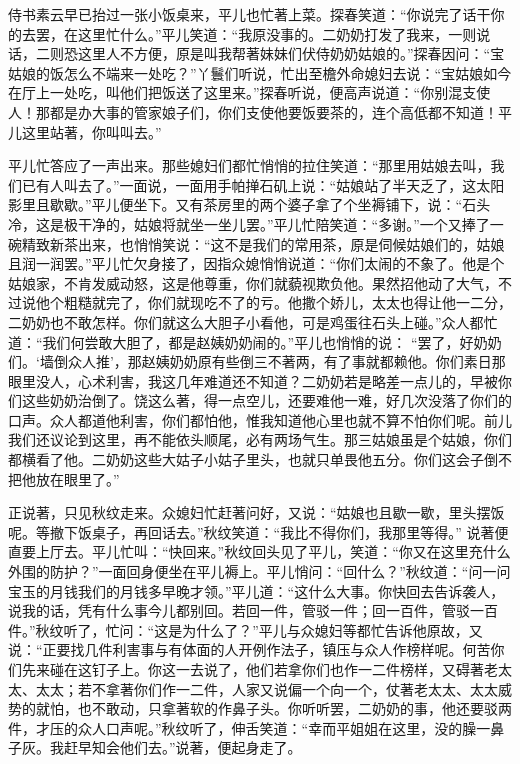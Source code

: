 \begin{parag}
    侍书素云早已抬过一张小饭桌来，平儿也忙著上菜。探春笑道：“你说完了话干你的去罢，在这里忙什么。”平儿笑道：“我原没事的。二奶奶打发了我来，一则说话，二则恐这里人不方便，原是叫我帮著妹妹们伏侍奶奶姑娘的。”探春因问：“宝姑娘的饭怎么不端来一处吃？”丫鬟们听说，忙出至檐外命媳妇去说：“宝姑娘如今在厅上一处吃，叫他们把饭送了这里来。”探春听说，便高声说道：“你别混支使人！那都是办大事的管家娘子们，你们支使他要饭要茶的，连个高低都不知道！平儿这里站著，你叫叫去。”
\end{parag}


\begin{parag}
    平儿忙答应了一声出来。那些媳妇们都忙悄悄的拉住笑道：“那里用姑娘去叫，我们已有人叫去了。”一面说，一面用手帕掸石矶上说：“姑娘站了半天乏了，这太阳影里且歇歇。”平儿便坐下。又有茶房里的两个婆子拿了个坐褥铺下，说：“石头冷，这是极干净的，姑娘将就坐一坐儿罢。”平儿忙陪笑道：“多谢。”一个又捧了一碗精致新茶出来，也悄悄笑说：“这不是我们的常用茶，原是伺候姑娘们的，姑娘且润一润罢。”平儿忙欠身接了，因指众媳悄悄说道：“你们太闹的不象了。他是个姑娘家，不肯发威动怒，这是他尊重，你们就藐视欺负他。果然招他动了大气，不过说他个粗糙就完了，你们就现吃不了的亏。他撒个娇儿，太太也得让他一二分，二奶奶也不敢怎样。你们就这么大胆子小看他，可是鸡蛋往石头上碰。”众人都忙道：“我们何尝敢大胆了，都是赵姨奶奶闹的。”平儿也悄悄的说： “罢了，好奶奶们。‘墙倒众人推’，那赵姨奶奶原有些倒三不著两，有了事就都赖他。你们素日那眼里没人，心术利害，我这几年难道还不知道？二奶奶若是略差一点儿的，早被你们这些奶奶治倒了。饶这么著，得一点空儿，还要难他一难，好几次没落了你们的口声。众人都道他利害，你们都怕他，惟我知道他心里也就不算不怕你们呢。前儿我们还议论到这里，再不能依头顺尾，必有两场气生。那三姑娘虽是个姑娘，你们都横看了他。二奶奶这些大姑子小姑子里头，也就只单畏他五分。你们这会子倒不把他放在眼里了。”
\end{parag}


\begin{parag}
    正说著，只见秋纹走来。众媳妇忙赶著问好，又说：“姑娘也且歇一歇，里头摆饭呢。等撤下饭桌子，再回话去。”秋纹笑道：“我比不得你们，我那里等得。” 说著便直要上厅去。平儿忙叫：“快回来。”秋纹回头见了平儿，笑道：“你又在这里充什么外围的防护？”一面回身便坐在平儿褥上。平儿悄问：“回什么？”秋纹道：“问一问宝玉的月钱我们的月钱多早晚才领。”平儿道：“这什么大事。你快回去告诉袭人，说我的话，凭有什么事今儿都别回。若回一件，管驳一件；回一百件，管驳一百件。”秋纹听了，忙问：“这是为什么了？”平儿与众媳妇等都忙告诉他原故，又说：“正要找几件利害事与有体面的人开例作法子，镇压与众人作榜样呢。何苦你们先来碰在这钉子上。你这一去说了，他们若拿你们也作一二件榜样，又碍著老太太、太太；若不拿著你们作一二件，人家又说偏一个向一个，仗著老太太、太太威势的就怕，也不敢动，只拿著软的作鼻子头。你听听罢，二奶奶的事，他还要驳两件，才压的众人口声呢。”秋纹听了，伸舌笑道：“幸而平姐姐在这里，没的臊一鼻子灰。我赶早知会他们去。”说著，便起身走了。
\end{parag}



